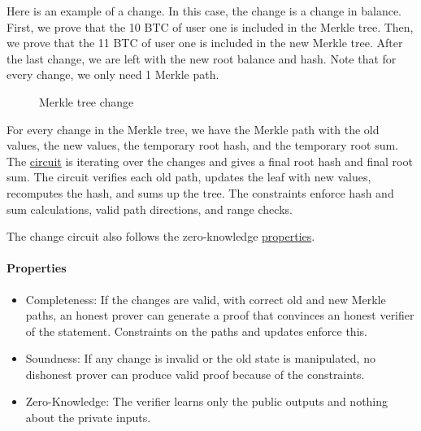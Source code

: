 Here is an example of a change. In this case, the change is a change in balance. First, we prove that the 10 BTC of user one is
included in the Merkle tree. Then, we prove that the 11 BTC of user one is included in the new Merkle tree. After the last change, we are left
with the new root balance and hash. Note that for every change, we only need 1 Merkle path.

\begin{figure}
   \hfill
   \hfill
   \hfill
   \caption{Merkle tree change}
   \end{figure}

For every change in the Merkle tree, we have the Merkle path with the old values, the new values, the temporary root hash, and the temporary root sum.
The \hyperref[subsec:plcc]{circuit} is iterating over the changes and gives a final root hash and final root sum. 
The circuit verifies each old path, updates the leaf with new values, recomputes the hash, and sums up the tree. 
The constraints enforce hash and sum calculations, valid path directions, and range checks.

The change circuit also follows the zero-knowledge \hyperref[subsec:zkp]{properties}. 
\paragraph{Properties}
\begin{itemize}
   \item Completeness: If the changes are valid, with correct old and new Merkle paths, an honest prover can generate a proof that convinces an honest verifier of the statement. Constraints on the paths and updates enforce this.
   \item Soundness: If any change is invalid or the old state is manipulated, no dishonest prover can produce valid proof because of the constraints.
   \item Zero-Knowledge: The verifier learns only the public outputs and nothing about the private inputs.
   \end{itemize}

